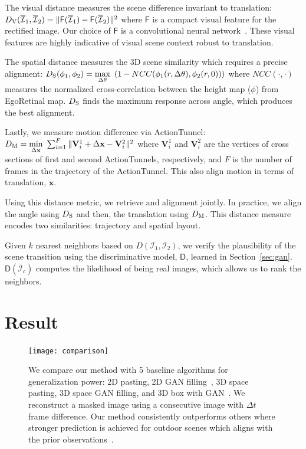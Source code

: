\documentclass[10pt,twocolumn,letterpaper]{article}
\begin{document}
The visual distance measures the scene difference invariant to translation: $D_{\rm V}(\overline{\mathcal{I}}_1, \overline{\mathcal{I}}_2) = \|\mathsf{F}(\overline{\mathcal{I}}_1)-\mathsf{F}(\overline{\mathcal{I}}_2)\|^2$ where $\mathsf{F}$ is a compact visual feature for the rectified image. Our choice of $\mathsf{F}$ is a convolutional neural network~\cite{krizhevsky:2012}. These visual features are highly indicative of visual scene context robust to translation. 

The spatial distance measures the 3D scene similarity which requires a precise alignment: $D_{\rm S}(\phi_1, \phi_2) =  \underset{\Delta \theta}{\operatorname{max}}~ \left(1-NCC(\phi_1(r,\Delta \theta),\phi_2(r,0))\right)$ where $NCC(\cdot,\cdot)$ measures the normalized cross-correlation between the height map ($\phi$) from EgoRetinal map. $D_{\rm S}$ finds the maximum response across angle, which produces the best alignment. 

Lastly, we measure motion difference via ActionTunnel: $D_{\rm M}= \underset{\Delta \mathbf{x}}{\operatorname{min}}~ \sum_{i=1}^F\|\mathbf{V}_i^1+\Delta \mathbf{x}-\mathbf{V}_i^2\|^2$ where $\mathbf{V}_i^1$ and $\mathbf{V}_i^2$ are the vertices of cross sections of first and second ActionTunnels, respectively, and $F$ is the number of frames in the trajectory of the ActionTunnel. This also align motion in terms of translation, $\mathbf{x}$.

Using this distance metric, we retrieve and alignment jointly. In practice, we align the angle using $D_{\rm S}$ and then, the translation using $D_{\rm M}$. This distance measure encodes two similarities: trajectory and spatial layout. 

Given $k$ nearest neighbors based on $D(\mathcal{I}_1, \mathcal{I}_2)$, we verify the plausibility of the scene transition using the discriminative model, $\mathsf{D}$, learned in Section~\ref{sec:gan}. $\mathsf{D}(\overline{\mathcal{I}}_c)$ computes the likelihood of being real images, which allows us to rank the neighbors. 

\section{Result}


\begin{figure*}[th]
  \centering  
      \texttt{[image: comparison]}
      ~
  \caption{We compare our method with 5 baseline algorithms for generalization power: 2D pasting, 2D GAN filling~\cite{pathakCVPR16context}, 3D space pasting, 3D space GAN filling, and 3D box with GAN~\cite{Horry:1997}. We reconstruct a masked image using a consecutive image with $\Delta t$ frame difference. Our method consistently outperforms others where stronger prediction is achieved for outdoor scenes which aligns with the prior observations~\cite{park:2016_future}.} 
  \label{Fig:quant}
\end{figure*}
\end{document}
